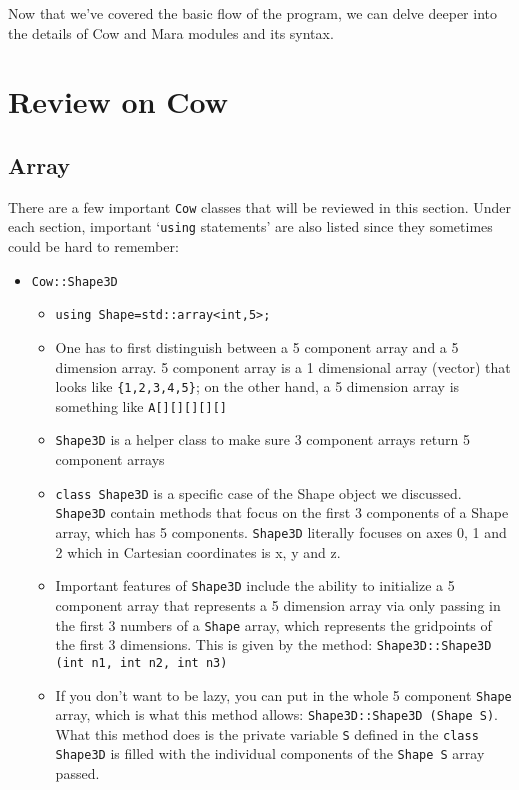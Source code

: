 \documentclass{article}
\begin{document}
Now that we've covered the basic flow of the program, we can delve deeper into the details of Cow and Mara modules and its syntax.

\section{Review on Cow}
\subsection{Array}

There are a few important \texttt{Cow} classes that will be reviewed in this section. Under each section, important `\texttt{using} statements' are also listed since they sometimes could be hard to remember:

\begin{itemize}
	\item \texttt{Cow::Shape3D}
	\begin{itemize}
		\item \texttt{using Shape=std::array<int,5>;} 
		\item One has to first distinguish between a 5 component array and a 5 dimension array. 5 component array is a 1 dimensional array (vector) that looks like \texttt{\{1,2,3,4,5\}}; on the other hand, a 5 dimension array is something like \texttt{A[][][][][]}
		\item \texttt{Shape3D} is a helper class to make sure 3 component arrays return 5 component arrays
		\item \texttt{class Shape3D} is a specific case of the Shape object we discussed. \texttt{Shape3D} contain methods that focus on the first 3 components of a Shape array, which has 5 components. \texttt{Shape3D} literally focuses on axes 0, 1 and 2 which in Cartesian coordinates is x, y and z. 
		\item Important features of \texttt{Shape3D} include the ability to initialize a 5 component array that represents a 5 dimension array via only passing in the first 3 numbers of a \texttt{Shape} array, which represents the gridpoints of the first 3 dimensions. This is given by the method: \texttt{Shape3D::Shape3D (int n1, int n2, int n3)}
		\item If you don't want to be lazy, you can put in the whole 5 component \texttt{Shape} array, which is what this method allows: \texttt{Shape3D::Shape3D (Shape S)}. What this method does is the private variable \texttt{S} defined in the \texttt{class Shape3D} is filled with the individual components of the \texttt{Shape S} array passed.	

\end{itemize}
\end{itemize}
\end{document}
